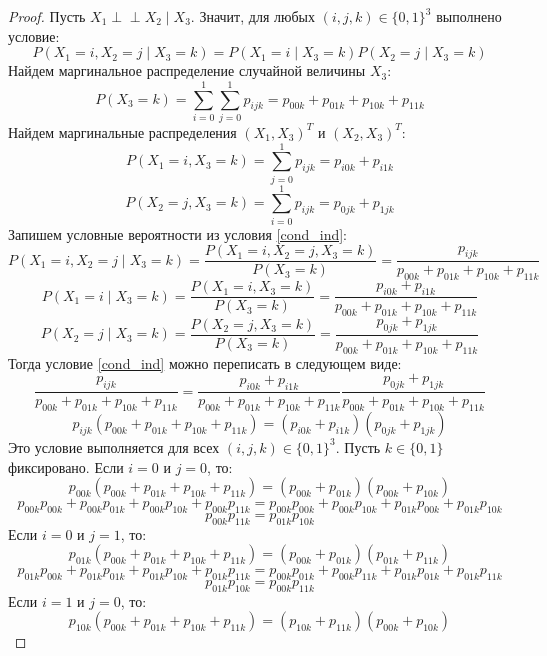 \documentclass{article}
\theoremstyle{definition}
\def\ci{\perp\!\!\!\perp}
\begin{document}
\begin{proof}
    Пусть $X_1 \ci X_2 \mid X_3$. Значит, для любых $(i,j,k) \in \{0,1\}^3$ выполнено условие:
    \begin{equation}\label{cond_ind}
        P(X_1=i, X_2=j \mid X_3 = k) = P(X_1=i \mid X_3 = k) P(X_2=j \mid X_3 = k)
    \end{equation}
    Найдем маргинальное распределение случайной величины $X_3$:
    $$
        P(X_3=k)=\sum_{i=0}^{1} \sum_{j=0}^{1} p_{ijk} = p_{00k} + p_{01k} + p_{10k} + p_{11k}
    $$
    Найдем маргинальные распределения $(X_1,X_3)^T$ и $(X_2,X_3)^T$:
    $$
        P(X_1=i, X_3=k) = \sum_{j=0}^{1} p_{ijk} = p_{i0k} + p_{i1k}
    $$
    $$
        P(X_2=j, X_3=k) = \sum_{i=0}^{1} p_{ijk} = p_{0jk} + p_{1jk}
    $$
    Запишем условные вероятности из условия \ref{cond_ind}:
    $$
        P(X_1=i, X_2=j \mid X_3 =k) = \dfrac{P(X_1=i, X_2=j , X_3 =k)}{P(X_3=k)} = \dfrac{p_{ijk}}{p_{00k} + p_{01k} + p_{10k} + p_{11k}}
    $$
    $$
        P(X_1=i \mid X_3 = k) = \dfrac{P(X_1=i, X_3 = k)}{P(X_3=k)} = \dfrac{p_{i0k} + p_{i1k}}{p_{00k} + p_{01k} + p_{10k} + p_{11k}}
    $$
    $$
        P(X_2=j \mid X_3 = k) = \dfrac{P(X_2=j, X_3=k)}{P(X_3=k)}=\dfrac{p_{0jk} + p_{1jk}}{p_{00k} + p_{01k} + p_{10k} + p_{11k}}
    $$
    Тогда условие \ref{cond_ind} можно переписать в следующем виде:
    $$
        \dfrac{p_{ijk}}{p_{00k} + p_{01k} + p_{10k} + p_{11k}} = \dfrac{p_{i0k} + p_{i1k}}{p_{00k} + p_{01k} + p_{10k} + p_{11k}}
        \dfrac{p_{0jk} + p_{1jk}}{p_{00k} + p_{01k} + p_{10k} + p_{11k}}
    $$
    $$
        p_{ijk} (p_{00k} + p_{01k} + p_{10k} + p_{11k}) = (p_{i0k} + p_{i1k}) (p_{0jk} + p_{1jk})
    $$
    Это условие выполняется для всех $(i,j,k) \in \{0,1\}^3$.
    Пусть $k \in \{0,1\}$ фиксировано.
    Если $i=0$ и $j=0$, то:
    $$
        p_{00k} (p_{00k} + p_{01k} + p_{10k} + p_{11k}) = (p_{00k} + p_{01k}) (p_{00k} + p_{10k})
    $$
    $$
        p_{00k} p_{00k} + p_{00k} p_{01k} + p_{00k} p_{10k} + p_{00k} p_{11k} =
        p_{00k} p_{00k} + p_{00k} p_{10k} + p_{01k} p_{00k} + p_{01k} p_{10k}
    $$
    $$
        p_{00k} p_{11k} = p_{01k} p_{10k}
    $$
    Если $i=0$ и $j=1$, то:
    $$
        p_{01k} (p_{00k} + p_{01k} + p_{10k} + p_{11k}) = (p_{00k} + p_{01k}) (p_{01k} + p_{11k})
    $$
    $$
        p_{01k}p_{00k} + p_{01k}p_{01k} + p_{01k}p_{10k} + p_{01k}p_{11k} =
        p_{00k}p_{01k} + p_{00k} p_{11k} + p_{01k} p_{01k} + p_{01k} p_{11k}
    $$
    $$
        p_{01k}p_{10k}=p_{00k} p_{11k}
    $$
    Если $i=1$ и $j=0$, то:
    $$
        p_{10k} (p_{00k} + p_{01k} + p_{10k} + p_{11k}) = (p_{10k} + p_{11k}) (p_{00k} + p_{10k})
$$
\end{proof}
\end{document}
